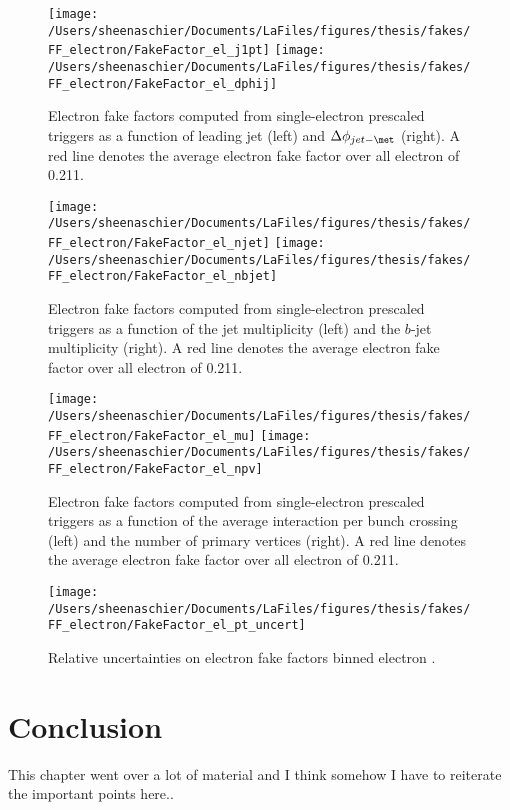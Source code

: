 \begin{figure}[tbp]
  \centering
  \texttt{[image: /Users/sheenaschier/Documents/LaFiles/figures/thesis/fakes/FF\_electron/FakeFactor\_el\_j1pt]}
  \texttt{[image: /Users/sheenaschier/Documents/LaFiles/figures/thesis/fakes/FF\_electron/FakeFactor\_el\_dphij]}\\
  \caption{Electron fake factors computed from single-electron prescaled triggers as a function of leading jet \pt{} (left) and $\Delta\phi_{jet-\met}$ (right). A red line denotes the average electron fake factor over all electron \pt{} of 0.211.}
  \label{fig:elec_FF_hadronic}
\end{figure}

\begin{figure}[tbp]
  \centering
  \texttt{[image: /Users/sheenaschier/Documents/LaFiles/figures/thesis/fakes/FF\_electron/FakeFactor\_el\_njet]}
  \texttt{[image: /Users/sheenaschier/Documents/LaFiles/figures/thesis/fakes/FF\_electron/FakeFactor\_el\_nbjet]}\\
  \caption{Electron fake factors computed from single-electron prescaled triggers as a function of the jet multiplicity (left) and the $b$-jet multiplicity (right). A red line denotes the average electron fake factor over all electron \pt{} of 0.211.}
  \label{fig:elec_FF_njet}
\end{figure}


\begin{figure}[tbp]
  \centering
  \texttt{[image: /Users/sheenaschier/Documents/LaFiles/figures/thesis/fakes/FF\_electron/FakeFactor\_el\_mu]}
  \texttt{[image: /Users/sheenaschier/Documents/LaFiles/figures/thesis/fakes/FF\_electron/FakeFactor\_el\_npv]}\\
  \caption{Electron fake factors computed from single-electron prescaled triggers as a function of the average interaction per bunch crossing (left) and the number of primary vertices (right). A red line denotes the average electron fake factor over all electron \pt{} of 0.211.}
  \label{fig:elec_FF_pileup}
\end{figure}

\begin{figure}[tbp]
  \centering
  \texttt{[image: /Users/sheenaschier/Documents/LaFiles/figures/thesis/fakes/FF\_electron/FakeFactor\_el\_pt\_uncert]}\\
  \caption{Relative uncertainties on electron fake factors binned electron \pt{}.}
  \label{fig:elec_FF_rel_uncert}
\end{figure}

 \FloatBarrier

 
 \section{Conclusion}
 \label{sec:FFcon}
 This chapter went over a lot of material and I think somehow I have to reiterate the important points here..
